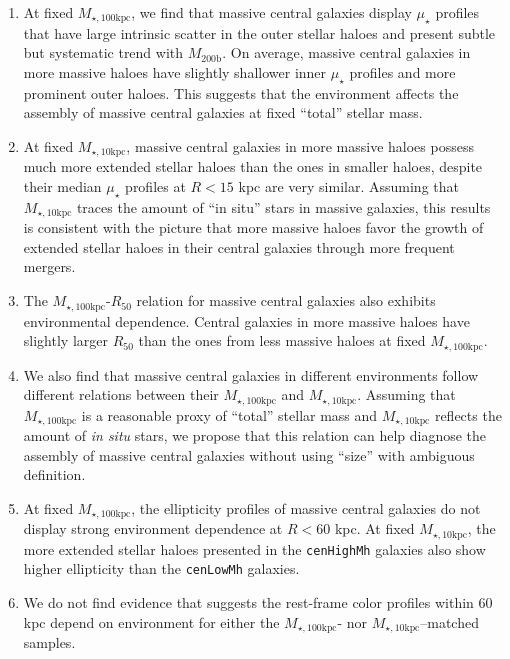 \documentclass[a4paper,fleqn,usenatbib]{mnras}
\def\rbcg{\texttt{cenHighMh}}
\def\nbcg{\texttt{cenLowMh}}
\def\mhalo{{$M_{\mathrm{200b}}$}}
\def\minn{{$M_{\star,10\mathrm{kpc}}$}}
\def\mtot{{$M_{\star,100\mathrm{kpc}}$}}
\def\mden{{$\mu_{\star}$}}
\begin{document}
    \begin{enumerate}
    
        \item At fixed \mtot{}, we find that massive central galaxies display \mden{} 
            profiles that have large intrinsic scatter in the outer stellar haloes and 
            present subtle but systematic trend with \mhalo{}.
            On average, massive central galaxies in more massive haloes have slightly 
            shallower inner \mden{} profiles and more prominent outer haloes. 
            This suggests that the environment affects the assembly of massive central
            galaxies at fixed ``total'' stellar mass.
            
        \item At fixed \minn{}, massive central galaxies in more massive haloes 
            possess much more extended stellar haloes than the ones in smaller haloes, 
            despite their median \mden{} profiles at $R < 15$ kpc are very similar. 
            Assuming that \minn{} traces the amount of ``in situ'' stars in massive
            galaxies, this results is consistent with the picture that more massive 
            haloes favor the growth of extended stellar haloes in their central 
            galaxies through more frequent mergers. 
        
        \item The \mtot{}-$R_{\mathrm{50}}$ relation for massive central galaxies 
            also exhibits environmental dependence. 
            Central galaxies in more massive haloes have slightly larger
            $R_{\mathrm{50}}$ than the ones from less massive haloes at fixed \mtot{}. 
        
        \item We also find that massive central galaxies in different environments
            follow different relations between their \mtot{} and \minn{}. 
            Assuming that \mtot{} is a reasonable proxy of ``total'' stellar mass and 
            \minn{} reflects the amount of \textit{in situ} stars, we propose that 
            this relation can help diagnose the assembly of massive central galaxies 
            without using ``size'' with ambiguous definition. 
        
        \item At fixed \mtot{}, the ellipticity profiles of massive central galaxies 
            do not display strong environment dependence at $R < 60$ kpc. 
            At fixed \minn{}, the more extended stellar haloes presented in the \rbcg{}
            galaxies also show higher ellipticity than the \nbcg{} galaxies. 
        
        \item We do not find evidence that suggests the rest-frame color profiles 
            within 60 kpc depend on environment for either the \mtot{}- nor 
            \minn{}--matched samples. 
             
    \end{enumerate}
    
\end{document}
